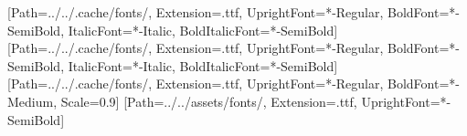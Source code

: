 \usepackage{fontspec}
\setmainfont{IBMPlexSans}[Path=../../.cache/fonts/, Extension=.ttf, UprightFont=*-Regular,
  BoldFont=*-SemiBold, ItalicFont=*-Italic, BoldItalicFont=*-SemiBold]
\setsansfont{IBMPlexSans}[Path=../../.cache/fonts/, Extension=.ttf, UprightFont=*-Regular,
  BoldFont=*-SemiBold, ItalicFont=*-Italic, BoldItalicFont=*-SemiBold]
\setmonofont{IBMPlexMono}[Path=../../.cache/fonts/, Extension=.ttf, UprightFont=*-Regular,
  BoldFont=*-Medium, Scale=0.9]
\newfontfamily{}[Path=../../assets/fonts/, Extension=.ttf, UprightFont=*-SemiBold]
\usepackage{xcolor}
\color{ink}
\usepackage{titlesec}
\titleformat{\section}{\editorial\Large}{}{0pt}{}
\titleformat{\subsection}{\editorial\large}{}{0pt}{}
\titlespacing*{\section}{0pt}{1.4em}{0.4em}
\linespread{1.12}
\setlength{\parskip}{0.5em}
\setlength{\parindent}{0pt}
\makeatletter
\renewcommand{\maketitle}{%
  {\color{cobalt}\ttfamily\small PLAIN-LANGUAGE REPORT\par}\vspace{0.5em}
  {\editorial\fontsize{22}{26}\selectfont\@title\par}\vspace{0.4em}
  {\large\color{subtle}TabPFN v2 · Kumo Tabular · 72 mice\par}\vspace{1.2em}}
\makeatother
\usepackage{graphicx}
